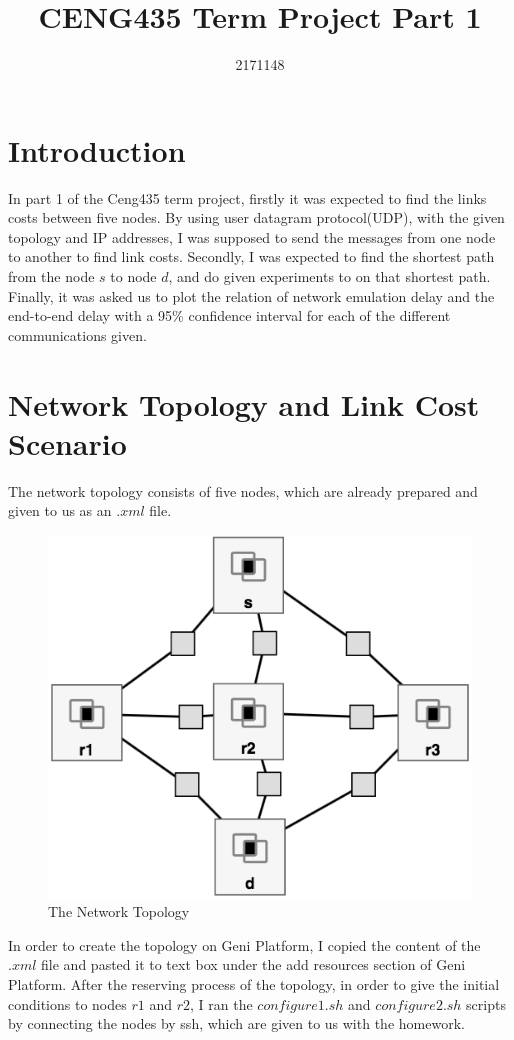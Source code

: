 \documentclass[conference]{IEEEtran}
\begin{document}
\title{CENG435 Term Project Part 1\\}

\author{
2171148
}
\maketitle

\section{Introduction}
In part 1 of the Ceng435 term project, firstly it was expected to find the links costs between five nodes. By using user datagram protocol(UDP), with the given topology and IP addresses, I was supposed to send the messages from one node to another to find link costs. Secondly, I was expected to find the shortest path from the node $s$ to node $d$, and do given experiments to on that shortest path. Finally, it was asked us to plot the  relation of network emulation delay and the end-to-end delay with a 95\% confidence interval for each of the different communications given.

\section{Network Topology and Link Cost Scenario}
The network topology consists of five nodes, which are already prepared and given to us as an $.xml$ file.
\begin{figure}[h!]
  \includegraphics[width=0.6\linewidth]{topology.png}
  \centering
  \caption{The Network Topology}
  \label{fig:Topology}
\end{figure}

In order to create the topology on Geni Platform, I copied the content of the $.xml$ file and pasted it to text box under the add resources section of Geni Platform. After the reserving process of the topology, in order to give the initial conditions to nodes $r1$ and $r2$, I ran the $configure1.sh$ and $configure2.sh$ scripts by connecting the nodes by ssh, which are given to us with the homework.
\end{document}
